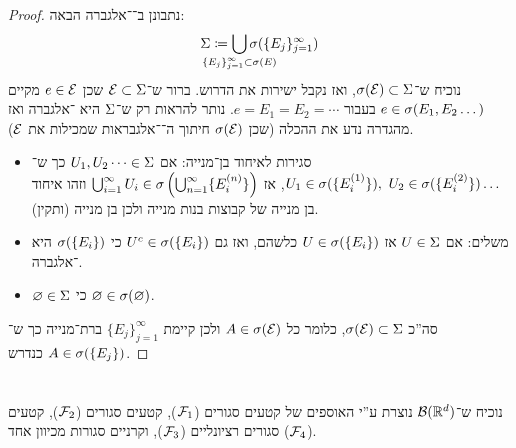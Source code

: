 \documentclass[]{../../../../tex/classes/homework}
\begin{document}
	\begin{proof}
		נתבונן ב־\ס־אלגברה הבאה: 
		\[ \Sg \cod \bigcup_{\mathclap{\{E_j\}_{j =1}^{\infty} \subset \sg(E)}} \sg(\{E_j\}_{j = 1}^{\infty}) \]
		נוכיח ש־$\sigma(\mathcal{E}) \subset \Sigma$, ואז נקבל ישירות את הדרוש. ברור ש־$\mathcal{E} \subset \Sigma$ שכן $e \in \mathcal{E}$ מקיים $e \in \sigma(E_1, E_2 \dots)$ בעבור $e = E_1 = E_2 = \cdots$. נותר להראות רק ש־$\Sigma$ היא \ס־אלגברה ואז מהגדרה נדע את ההכלה (שכן $\sigma(\mathcal{E})$ חיתוך ה־\ס־אלגבראות שמכילות את $\mathcal{E}$). 
		\begin{itemize}
			\item סגירות לאיחוד בן־מנייה: אם $U_1, U_2 \dots \in \Sigma$ כך ש־$U_1 \in \sigma(\{E_i^{(1)}\}), \ U_2 \in \sigma(\{E_i^{(2)}\})\dots$, אז $\bigcup_{i = 1}^{\infty}U_i \in \sigma \left ( \bigcup_{n = 1}^{\infty}\{E_i^{(n)}\} \right )$ וזהו איחוד בן מנייה של קבוצות בנות מנייה ולכן בן מנייה (ותקין). 
			\item משלים: אם $U \in \Sigma$ אז $U \in \sigma(\{E_i\})$ כלשהם, ואז גם $U^{c} \in \sigma(\{E_i\})$ כי $\sigma(\{E_i\})$ היא \ס־אלגברה. 
			\item $\varnothing \in \Sigma$ כי $\varnothing \in \sigma(\varnothing)$. 
		\end{itemize}
		סה''כ $\sigma(\mathcal{E}) \subset \Sigma$, כלומר כל $A \in \sigma(\mathcal{E})$ ולכן קיימת $\{E_j\}_{j = 1}^{\infty}$ ברת־מנייה כך ש־$A \in \sigma(\{E_j\})$ כנדרש. 
	\end{proof}
	\section{}
	נוכיח ש־$\mathcal{B}(\mathbb{R}^{d})$ נוצרת ע''י האוספים של קטעים סגורים ($\mathcal{F}_1$), קטעים סגורים ($\mathcal{F}_2$), קטעים סגורים רציונליים ($\mathcal{F}_3$), וקרניים סגורות מכיוון אחד ($\mathcal{F}_4$). 
	
\end{document}
